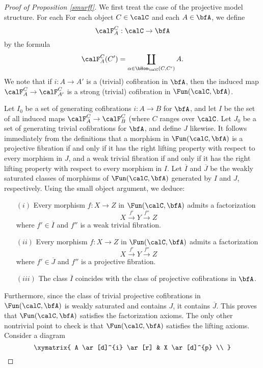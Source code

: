 \begin{proof}[Proof of Proposition \ref{smurff}]
We first treat the case of the projective model structure. For each
For each object $C \in \calC$ and each $A \in \bfA$, we define 
$$\calF^C_A: \calC \rightarrow \bfA$$
by the formula
$$\calF^C_A(C') = \coprod_{ \alpha \in \bHom_{\calC}(C,C') } A.$$
We note that if $i: A \rightarrow A'$ is a (trivial) cofibration in $\bfA$, then the induced map
$\calF^C_{A} \rightarrow \calF^C_{A'}$ is a strong (trivial) cofibration in $\Fun(\calC, \bfA)$. 

Let $I_0$ be a set of generating cofibrations $i: A \rightarrow B$ for $\bfA$, and let $I$ be the set of all induced maps $\calF^{C}_{A} \rightarrow \calF^{C}_{B}$ (where $C$ ranges over $\calC$. Let $J_0$ be a set of generating trivial cofibrations for $\bfA$, and define 
$J$ likewise. It follows immediately from the definitions that a morphism in $\Fun(\calC, \bfA)$ is a projective fibration if and only if it has the right lifting property with respect to every morphism in $J$, and a weak trivial fibration if and only if it has the right lifting property with respect to every morphism in $I$. Let $\overline{I}$ and $\overline{J}$ be the weakly saturated classes of morphisms of $\Fun(\calC, \bfA)$ generated by $I$ and $J$, respectively. Using the small object argument, we deduce:
\begin{itemize}
\item[$(i)$] Every morphism $f: X \rightarrow Z$ in $\Fun(\calC, \bfA)$ admits a factorization
$$ X \stackrel{f'}{\rightarrow} Y \stackrel{f''}{\rightarrow} Z$$
where $f' \in \overline{I}$ and $f''$ is a weak trivial fibration.
\item[$(ii)$] Every morphism $f: X \rightarrow Z$ in $\Fun(\calC, \bfA)$ admits a factorization
$$ X \stackrel{f'}{\rightarrow} Y \stackrel{f''}{\rightarrow} Z$$
where $f' \in \overline{J}$ and $f''$ is a projective fibration. 
\item[$(iii)$] The class $\overline{I}$ coincides with the class of projective cofibrations in $\bfA$.
\end{itemize}
Furthermore, since the class of trivial projective cofibrations in $\Fun(\calC, \bfA)$ is weakly saturated and contains $J$, it contains $\overline{J}$. This proves that $\Fun(\calC, \bfA)$ satisfies the factorization axioms. The only other nontrivial point to check is that $\Fun(\calC, \bfA)$ satisfies the lifting axioms. Consider a diagram
$$ \xymatrix{ A \ar[d]^{i} \ar[r] & X \ar[d]^{p} \\
}$$
\end{proof}
